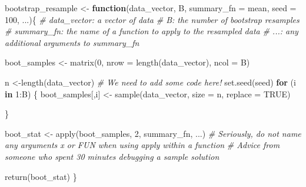 \documentclass[
]{article}
\newenvironment{Shaded}{\begin{snugshade}}{\end{snugshade}}
\newcommand{\AttributeTok}[1]{\textcolor[rgb]{0.77,0.63,0.00}{#1}}
\newcommand{\CommentTok}[1]{\textcolor[rgb]{0.56,0.35,0.01}{\textit{#1}}}
\newcommand{\ConstantTok}[1]{\textcolor[rgb]{0.00,0.00,0.00}{#1}}
\newcommand{\ControlFlowTok}[1]{\textcolor[rgb]{0.13,0.29,0.53}{\textbf{#1}}}
\newcommand{\DecValTok}[1]{\textcolor[rgb]{0.00,0.00,0.81}{#1}}
\newcommand{\FunctionTok}[1]{\textcolor[rgb]{0.00,0.00,0.00}{#1}}
\newcommand{\NormalTok}[1]{#1}
\newcommand{\OtherTok}[1]{\textcolor[rgb]{0.56,0.35,0.01}{#1}}
\newcommand{\SpecialCharTok}[1]{\textcolor[rgb]{0.00,0.00,0.00}{#1}}
\begin{document}
\begin{Shaded}
\begin{Highlighting}[]
\NormalTok{bootstrap\_resample }\OtherTok{\textless{}{-}} \ControlFlowTok{function}\NormalTok{(data\_vector, B, }\AttributeTok{summary\_fn =}\NormalTok{ mean,}
                               \AttributeTok{seed =} \DecValTok{100}\NormalTok{, ...)\{}
  \CommentTok{\# data\_vector: a vector of data}
  \CommentTok{\# B: the number of bootstrap resamples}
  \CommentTok{\# summary\_fn: the name of a function to apply to the resampled data}
  \CommentTok{\# ...: any additional arguments to summary\_fn}
  
\NormalTok{  boot\_samples }\OtherTok{\textless{}{-}} \FunctionTok{matrix}\NormalTok{(}\DecValTok{0}\NormalTok{, }\AttributeTok{nrow =} \FunctionTok{length}\NormalTok{(data\_vector), }\AttributeTok{ncol =}\NormalTok{ B)}
  
\NormalTok{  n }\OtherTok{\textless{}{-}}\FunctionTok{length}\NormalTok{(data\_vector)}
  \CommentTok{\# We need to add some code here!}
  \FunctionTok{set.seed}\NormalTok{(seed)}
  \ControlFlowTok{for}\NormalTok{ (i }\ControlFlowTok{in} \DecValTok{1}\SpecialCharTok{:}\NormalTok{B) \{}
\NormalTok{     boot\_samples[,i] }\OtherTok{\textless{}{-}} \FunctionTok{sample}\NormalTok{(data\_vector, }\AttributeTok{size =}\NormalTok{ n, }\AttributeTok{replace =} \ConstantTok{TRUE}\NormalTok{)}
    
\NormalTok{  \}}

\NormalTok{  boot\_stat }\OtherTok{\textless{}{-}} \FunctionTok{apply}\NormalTok{(boot\_samples, }\DecValTok{2}\NormalTok{, summary\_fn, ...)}
  \CommentTok{\# Seriously, do not name any arguments x or FUN when using apply within a function}
  \CommentTok{\# Advice from someone who spent 30 minutes debugging a sample solution}
  
  \FunctionTok{return}\NormalTok{(boot\_stat)}
\NormalTok{\}}
\end{Highlighting}
\end{Shaded}
\end{document}
